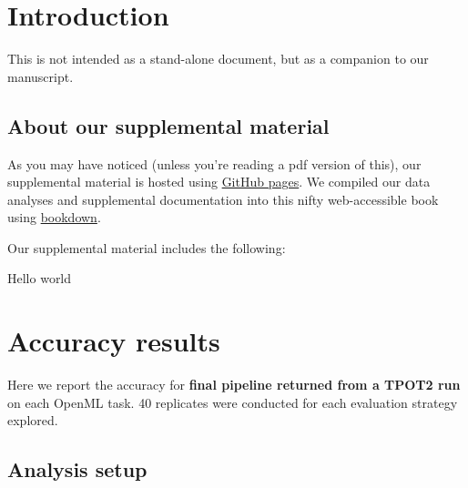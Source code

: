 \documentclass[
]{book}
\newenvironment{Shaded}{\begin{snugshade}}{\end{snugshade}}
\newcommand{\AttributeTok}[1]{\textcolor[rgb]{0.13,0.29,0.53}{#1}}
\newcommand{\ConstantTok}[1]{\textcolor[rgb]{0.56,0.35,0.01}{#1}}
\newcommand{\FunctionTok}[1]{\textcolor[rgb]{0.13,0.29,0.53}{\textbf{#1}}}
\newcommand{\NormalTok}[1]{#1}
\newcommand{\OtherTok}[1]{\textcolor[rgb]{0.56,0.35,0.01}{#1}}
\newcommand{\SpecialCharTok}[1]{\textcolor[rgb]{0.81,0.36,0.00}{\textbf{#1}}}
\newcommand{\StringTok}[1]{\textcolor[rgb]{0.31,0.60,0.02}{#1}}
\begin{document}
\hypertarget{introduction}{%
\chapter{Introduction}\label{introduction}}

This is not intended as a stand-alone document, but as a companion to our manuscript.

\hypertarget{about-our-supplemental-material}{%
\section{About our supplemental material}\label{about-our-supplemental-material}}

As you may have noticed (unless you're reading a pdf version of this), our supplemental material is hosted using \href{https://pages.github.com/}{GitHub pages}.
We compiled our data analyses and supplemental documentation into this nifty web-accessible book using \href{https://bookdown.org}{bookdown}.

Our supplemental material includes the following:

Hello world

\hypertarget{accuracy-results}{%
\chapter{Accuracy results}\label{accuracy-results}}

Here we report the accuracy for \textbf{final pipeline returned from a TPOT2 run} on each OpenML task.
40 replicates were conducted for each evaluation strategy explored.

\hypertarget{analysis-setup}{%
\section{Analysis setup}\label{analysis-setup}}

\begin{Shaded}
\end{Shaded}
\end{document}
